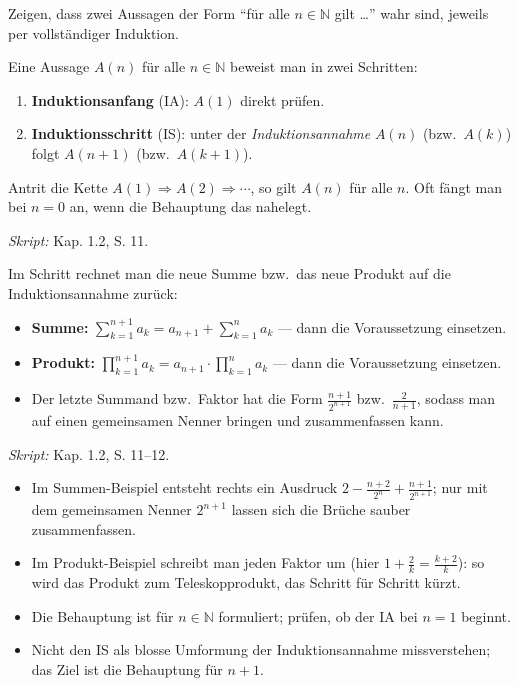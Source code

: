 

Zeigen, dass zwei Aussagen der Form ``für alle $n\in\mathbb N$ gilt …'' wahr
sind, jeweils per vollständiger Induktion.

\begin{werkzeugkasten}
Eine Aussage $A(n)$ für alle $n\in\mathbb N$ beweist man in zwei Schritten:
\begin{enumerate}
  \item \textbf{Induktionsanfang} (IA): $A(1)$ direkt prüfen.
  \item \textbf{Induktionsschritt} (IS): unter der \emph{Induktionsannahme}
        $A(n)$ (bzw.\ $A(k)$) folgt $A(n+1)$ (bzw.\ $A(k+1)$).
\end{enumerate}
Antrit die Kette $A(1)\Rightarrow A(2)\Rightarrow\cdots$, so gilt $A(n)$ für
alle $n$. Oft fängt man bei $n=0$ an, wenn die Behauptung das nahelegt.

\textit{Skript:} Kap. 1.2, S. 11.
\end{werkzeugkasten}

\begin{werkzeugkasten}[Hilfsmittel im IS]
Im Schritt rechnet man die neue Summe bzw.\ das neue Produkt auf die
Induktionsannahme zurück:
\begin{itemize}
  \item \textbf{Summe:} $\displaystyle\sum_{k=1}^{n+1}a_k = a_{n+1} +
        \sum_{k=1}^{n}a_k$ — dann die Voraussetzung einsetzen.
  \item \textbf{Produkt:} $\displaystyle\prod_{k=1}^{n+1}a_k =
        a_{n+1}\cdot\prod_{k=1}^{n}a_k$ — dann die Voraussetzung einsetzen.
  \item Der letzte Summand bzw.\ Faktor hat die Form $\frac{n+1}{2^{n+1}}$
        bzw.\ $\frac{2}{n+1}$, sodass man auf einen gemeinsamen Nenner bringen
        und zusammenfassen kann.
\end{itemize}
\textit{Skript:} Kap. 1.2, S. 11--12.
\end{werkzeugkasten}

\begin{achtung}
\begin{itemize}
  \item Im Summen-Beispiel entsteht rechts ein Ausdruck
        $2-\frac{n+2}{2^n}+\frac{n+1}{2^{n+1}}$; nur mit dem gemeinsamen
        Nenner $2^{n+1}$ lassen sich die Brüche sauber zusammenfassen.
  \item Im Produkt-Beispiel schreibt man jeden Faktor um
        (hier $1+\frac2k=\frac{k+2}{k}$): so wird das Produkt zum
        Teleskopprodukt, das Schritt für Schritt kürzt.
  \item Die Behauptung ist für $n\in\mathbb N$ formuliert; prüfen, ob der
        IA bei $n=1$ beginnt.
  \item Nicht den IS als blosse Umformung der Induktionsannahme missverstehen;
        das Ziel ist die Behauptung für $n+1$.
\end{itemize}
\end{achtung}
